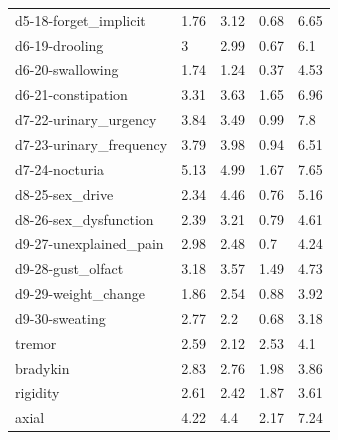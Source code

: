 \documentclass[10pt]{article}
\begin{document}
\begin{multicols}{2}
\begin{table}[p]
\begin{tabular}{l|l|l|l|l}
d5-18-forget\_implicit & 1.76 & 3.12 & 0.68 & 6.65 \\
d6-19-drooling & 3 & 2.99 & 0.67 & 6.1 \\
d6-20-swallowing & 1.74 & 1.24 & 0.37 & 4.53 \\
d6-21-constipation & 3.31 & 3.63 & 1.65 & 6.96 \\
d7-22-urinary\_urgency & 3.84 & 3.49 & 0.99 & 7.8 \\
d7-23-urinary\_frequency & 3.79 & 3.98 & 0.94 & 6.51 \\
d7-24-nocturia & 5.13 & 4.99 & 1.67 & 7.65 \\
d8-25-sex\_drive & 2.34 & 4.46 & 0.76 & 5.16 \\
d8-26-sex\_dysfunction & 2.39 & 3.21 & 0.79 & 4.61 \\
d9-27-unexplained\_pain & 2.98 & 2.48 & 0.7 & 4.24 \\
d9-28-gust\_olfact & 3.18 & 3.57 & 1.49 & 4.73 \\
d9-29-weight\_change & 1.86 & 2.54 & 0.88 & 3.92 \\
d9-30-sweating & 2.77 & 2.2 & 0.68 & 3.18 \\
\hline
tremor & 2.59 & 2.12 & 2.53 & 4.1 \\
bradykin & 2.83 & 2.76 & 1.98 & 3.86 \\
rigidity & 2.61 & 2.42 & 1.87 & 3.61 \\
axial & 4.22 & 4.4 & 2.17 & 7.24 \\
  \end{tabular}
\end{table}


\end{multicols}
\end{document}
